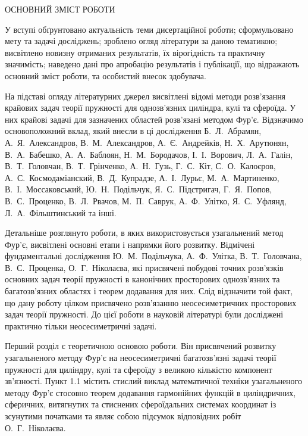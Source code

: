 \documentclass[book,14pt,small,oneside]{ncc}
\begin{document}
\begin{center}
ОСНОВНИЙ ЗМІСТ РОБОТИ
\end{center}

У вступі обґрунтовано актуальність теми дисертаційної роботи; сформульовано мету та задачі досліджень; зроблено огляд літератури за даною тематикою; висвітлено новизну отриманих результатів, їх вірогідність та практичну значимість; наведено дані про апробацію результатів і публікації, що відражають основний зміст роботи, та особистий внесок здобувача. 

На підставі огляду літературних джерел висвітлені відомі методи роз\-в'язан\-ня крайових задач теорії пружності для однозв'язних циліндра, кулі та сфероїда. У них крайові задачі для зазначених областей розв'язані методом Фур'є. Відзначимо основоположний вклад, який внесли в ці дослідження Б.~Л.~Абрамян, А.~Я.~Александров, В.~М.~Александров, А.~Є.~Андрейків, Н.~Х.~Арутюнян, В.~А.~Бабешко, А.~А.~Баблоян, Н.~М.~Бородачов, І.~І.~Ворович, Л.~А.~Галін, В.~Т.~Головчан, В.~Т.~Грінченко, А.~Н.~Гузь, Г.~С.~Кіт, С.~О.~Калоєров, А.~С.~Космодаміанский, В.~Д.~Купрадзе, А.~І.~Лурьє, М.~А.~Мартиненко, В.~І.~Моссаковський, Ю.~Н.~Подільчук, Я.~С.~Підстригач, Г.~Я.~Попов, В.~С.~Проценко, В.~Л.~Рвачов, М.~П.~Саврук, А.~Ф.~Улітко, Я.~С.~Уфлянд, Л.~А.~Фільштинський та інші.

Детальніше розглянуто роботи, в яких використовується узагальнений метод Фур'є, висвітлені основні етапи і напрямки його розвитку. Відмічені фундаментальні дослідження Ю.~М.~Подільчука, А.~Ф.~Улітка, В.~Т.~Головчана, В.~С.~Проценка, О.~Г.~Ніколаєва, які присвячені побудові точних розв'язків основних задач теорії пружності в канонічних просторових однозв'язних та багатозв'язних областях і теорем додавання для них. Слід відзначити той факт, що дану роботу цілком присвячено розв'язанню неосесиметричних просторових задач теорії пружності. До цієї роботи в науковій літературі були досліджені практично тільки неосесиметричні задачі.

Перший розділ є теоретичною основою роботи. Він присвячений розвитку узагальненого методу Фур'є на неосесиметричні багатозв'язні задачі теорії пружності для циліндру, кулі та сфероїду з великою кількістю компонент зв'язності. Пункт 1.1 містить стислий виклад математичної техніки узагальненого методу Фур'є стосовно теорем додавання гармонійних функцій в циліндричних, сферичних, витягнутих та стиснених сфероїдальних системах координат із зсунутими початками та являє собою підсумок відповідних робіт О.~Г.~Ніколаєва.
\end{document}

